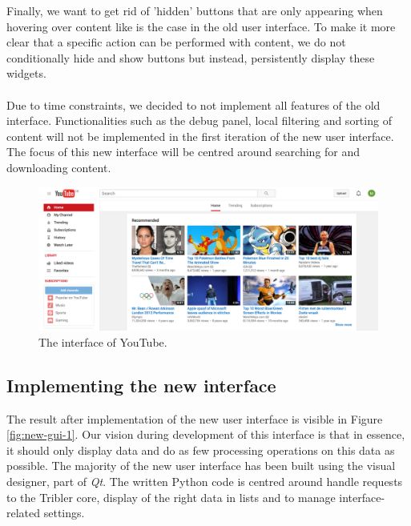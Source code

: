 Finally, we want to get rid of 'hidden' buttons that are only appearing when hovering over content like is the case in the old user interface. To make it more clear that a specific action can be performed with content, we do not conditionally hide and show buttons but instead, persistently display these widgets.\\\\
Due to time constraints, we decided to not implement all features of the old interface. Functionalities such as the debug panel, local filtering and sorting of content will not be implemented in the first iteration of the new user interface. The focus of this new interface will be centred around searching for and downloading content.

\begin{figure}[t]
	\centering
	\includegraphics[width=1.0\columnwidth]{images/implementation/youtube_interface}
	\caption{The interface of YouTube.}
	\label{fig:youtube-interface}
\end{figure}

\subsection{Implementing the new interface}
The result after implementation of the new user interface is visible in Figure \ref{fig:new-gui-1}. Our vision during development of this interface is that in essence, it should only display data and do as few processing operations on this data as possible. The majority of the new user interface has been built using the visual designer, part of \emph{Qt}. The written Python code is centred around handle requests to the Tribler core, display of the right data in lists and to manage interface-related settings.\\

